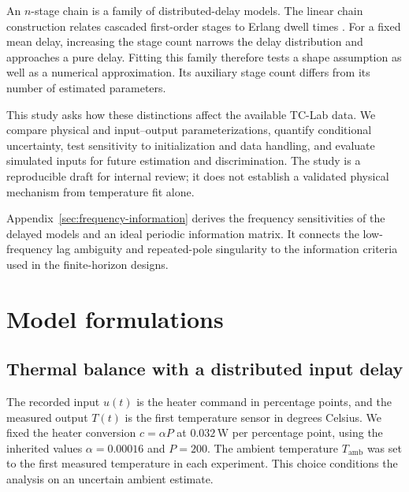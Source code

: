 \documentclass[11pt]{article}
\newcommand{\Tamb}{T_{\mathrm{amb}}}
\begin{document}
An $n$-stage chain is a family of distributed-delay models. The linear chain
construction relates cascaded first-order stages to Erlang dwell times
\citep{hurtado-2019-generalizations}. For a fixed mean delay, increasing the stage
count narrows the delay distribution and approaches a pure delay. Fitting this
family therefore tests a shape assumption as well as a numerical approximation.
Its auxiliary stage count differs from its number of estimated parameters.

This study asks how these distinctions affect the available TC-Lab data. We
compare physical and input--output parameterizations, quantify conditional
uncertainty, test sensitivity to initialization and data handling, and evaluate
simulated inputs for future estimation and discrimination. The study is a
reproducible draft for internal review; it does not establish a validated
physical mechanism from temperature fit alone.

Appendix~\ref{sec:frequency-information} derives the frequency sensitivities
of the delayed models and an ideal periodic information matrix. It connects the
low-frequency lag ambiguity and repeated-pole singularity to the information
criteria used in the finite-horizon designs.



\section{Model formulations}
\label{sec:models}

\subsection{Thermal balance with a distributed input delay}
The recorded input $u(t)$ is the heater command in percentage points, and the measured
output $T(t)$ is the first temperature sensor in degrees Celsius. We fixed the
heater conversion $c=\alpha P$ at $0.032\,\mathrm{W}$ per percentage point, using
the inherited values $\alpha=0.00016$ and $P=200$. The ambient temperature
$\Tamb$ was set to the first measured temperature in each experiment. This
choice conditions the analysis on an uncertain ambient estimate.
\end{document}
